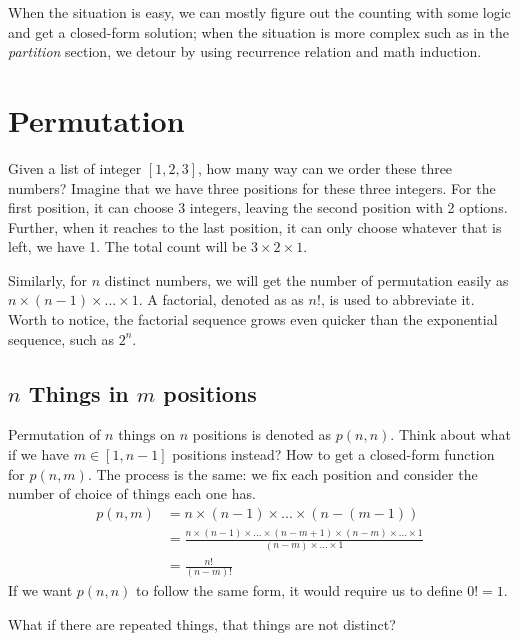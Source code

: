 \documentclass[../main.tex]{subfiles}
\begin{document}
When the situation is easy, we can mostly figure out the counting with some logic and get a closed-form solution; when the situation is more complex such as in the \textit{partition} section, we detour by using recurrence relation and math induction. 
\section{Permutation}
Given a list of integer $[1,2,3]$, how many way can we order these three numbers? Imagine that we have three positions for these three integers.  For the first position, it can choose 3 integers, leaving the second position with 2 options. Further, when it reaches to the last position, it can only choose whatever that is left, we have 1. The total count will be $3\times2\times1$. 

Similarly, for $n$ distinct numbers,  we will get the number of permutation  easily as $n\times(n-1)\times...\times1$. A factorial, denoted as as $n!$, is used to abbreviate it. Worth to notice, the factorial sequence grows even quicker than the exponential sequence, such as $2^n$. 

\subsection{$n$ Things in $m$ positions}  Permutation of $n$ things on $n$ positions is denoted as $p(n,n)$. Think about what if we have $m\in[1, n-1]$ positions instead? How to get a closed-form function for  $p(n,m)$.  The process is the same: we fix each position and consider the number of choice of things each one has. 
\begin{align}
   p(n,m) &= n\times(n-1)\times...\times (n-(m-1)) \\
   &=\frac{n\times(n-1)\times...\times (n-m+1)\times (n-m)\times...\times 1}{(n-m)\times...\times 1}\\
   &=\frac{n!}{(n-m)!}
\end{align}
If we want $p(n,n)$ to follow the same form, it would require us to define $0!=1$.
\begin{bclogo}[couleur = blue!30, arrondi=0.1,logo=\bccrayon,ombre=true]{What if there are repeated things, that things are not distinct? } 
\end{bclogo}
\end{document}
